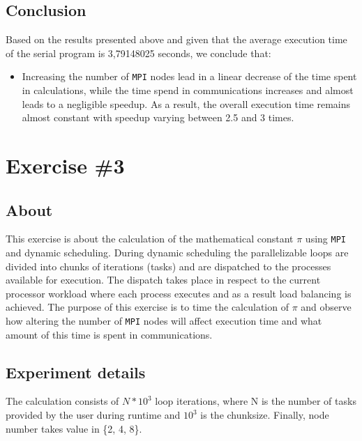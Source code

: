 \documentclass{article}
\begin{document}
\pagebreak

\subsection{Conclusion}
Based on the results presented above and given that the average execution time of the serial
program is 3,79148025 seconds, we conclude that:

\begin{itemize}
 \item Increasing the number of \texttt{MPI} nodes lead in a linear decrease
       of the time spent in calculations, while the time spend in communications
       increases and almost leads to a negligible speedup. As a result, the overall
       execution time remains almost constant with speedup varying between 2.5 and 3 times.
\end{itemize}



\section{Exercise \#3}

\subsection{About}
This exercise is about the calculation of the mathematical constant $\pi$ using \texttt{MPI}
and dynamic scheduling. During dynamic scheduling the parallelizable loops are divided
into chunks of iterations (tasks) and are dispatched to the processes available for execution.
The dispatch takes place in respect to the current processor workload where each process executes
and as a result load balancing is achieved. The purpose of this exercise is to time the calculation
of $\pi$ and observe how altering the number of \texttt{MPI} nodes will affect execution time
and what amount of this time is spent in communications.


\subsection{Experiment details}
The calculation consists of $N*10^3$ loop iterations, where N is the number of tasks provided
by the user during runtime and $10^3$ is the chunksize. Finally, node number takes value in
\{2, 4, 8\}.
\end{document}
